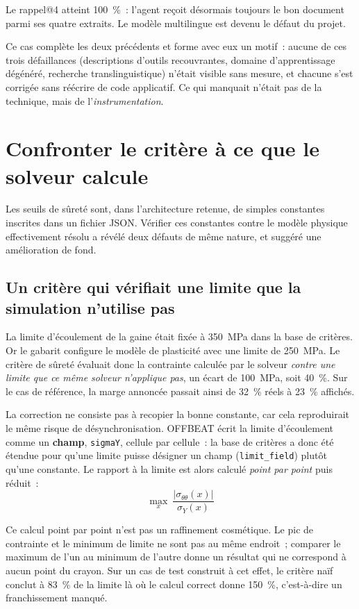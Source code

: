 \documentclass[12pt,a4paper,french]{report}
\begin{document}
Le rappel@4 atteint \SI{100}{\percent}~: l'agent reçoit désormais toujours le
bon document parmi ses quatre extraits. Le modèle multilingue est devenu le
défaut du projet.

Ce cas complète les deux précédents et forme avec eux un motif~: aucune de ces
trois défaillances (descriptions d'outils recouvrantes, domaine d'apprentissage
dégénéré, recherche translinguistique) n'était visible sans mesure, et chacune
s'est corrigée sans réécrire de code applicatif. Ce qui manquait n'était pas de
la technique, mais de l'\emph{instrumentation}.

\section{Confronter le critère à ce que le solveur calcule}
\label{sec:seuils}

Les seuils de sûreté sont, dans l'architecture retenue, de simples constantes
inscrites dans un fichier JSON. Vérifier ces constantes contre le modèle
physique effectivement résolu a révélé deux défauts de même nature, et suggéré
une amélioration de fond.

\subsection{Un critère qui vérifiait une limite que la simulation n'utilise pas}

La limite d'écoulement de la gaine était fixée à \SI{350}{\mega\pascal} dans la
base de critères. Or le gabarit configure le modèle de plasticité avec une
limite de \SI{250}{\mega\pascal}. Le critère de sûreté évaluait donc la
contrainte calculée par le solveur \emph{contre une limite que ce même solveur
n'applique pas}, un écart de \SI{100}{\mega\pascal}, soit \SI{40}{\percent}.
Sur le cas de référence, la marge annoncée passait ainsi de
\SI{32}{\percent} réels à \SI{23}{\percent} affichés.

La correction ne consiste pas à recopier la bonne constante, car cela
reproduirait le même risque de désynchronisation. OFFBEAT écrit la limite
d'écoulement comme un \textbf{champ}, \texttt{sigmaY}, cellule par cellule~: la
base de critères a donc été étendue pour qu'une limite puisse désigner un champ
(\texttt{limit\_field}) plutôt qu'une constante. Le rapport à la limite est
alors calculé \emph{point par point} puis réduit~:
\[
  \max_{x}\ \frac{|\sigma_{\theta\theta}(x)|}{\sigma_Y(x)}
\]

Ce calcul point par point n'est pas un raffinement cosmétique. Le pic de
contrainte et le minimum de limite ne sont pas au même endroit~; comparer le
maximum de l'un au minimum de l'autre donne un résultat qui ne correspond à
aucun point du crayon. Sur un cas de test construit à cet effet, le critère
naïf conclut à \SI{83}{\percent} de la limite là où le calcul correct donne
\SI{150}{\percent}, c'est-à-dire un franchissement manqué.
\end{document}
